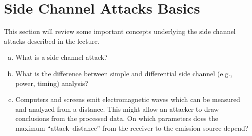 \documentclass[a4paper,11pt]{article}
\newif\ifsolution\solutionfalse
\newcommand{\includeonlyinsolution}[1]{\ifsolution#1\fi}
\newenvironment{solution}%
{\par{\noindent\small\textit{Solution:}}\vspace{-12pt}\begin{framed}}%
{\end{framed}\par}
\begin{document}
\section{Side Channel Attacks Basics}
This section will review some important concepts underlying the side channel
attacks described in the lecture.
\begin{enumerate}[(a)]
\item What is a side channel attack?
\includeonlyinsolution{\begin{solution}
A side channel attack is an attack that uses side information leaked from an
existing implementation of a cryptosystem, other than the plaintext or the ciphertext.
This information can be either the running time of an encryption, the power consumption,
the EM emissions, the heat, etc.
\end{solution}}
\item What is the difference between simple and differential side channel
  (e.g., power, timing) analysis?
\includeonlyinsolution{\begin{solution}
Simple side channel attacks use information (power consumed or duration of execution)
during a single execution of an encryption operation. Usually they are based on looking at
the visual representation of the measured metric.\\
Differential side channel attacks, on the other hand, use statistical analysis
on partial operations of the execution of an encryption operation. They focus
on timing/power analysis on parts of the encryption/decryption algorithm, instead of the
overall execution.

\end{solution}}

\item Computers and screens emit electromagnetic waves which can be measured and
analyzed from a distance. This might allow an attacker to draw conclusions from the
processed data. On which parameters does the maximum ``attack--distance'' from the
receiver to the emission source depend?
\includeonlyinsolution{\begin{solution}
The emitted electromagnetic waves can be contained inside the corresponding devices
and thus decreasing the maximum ``attack--distance'' from the receiver to the source.
According to \cite{AttacksOnSmartcards}, measures for containing the radiation are:
metal layers added to the device/chip, blurring the emanation, introducing more
noise into the EM field and smaller dimension of transistors. Essentially, building
a Faraday cage around the device can stop these emissions, but this can be difficult
and quite unfeasible.

\end{solution}}


\end{enumerate}
\end{document}
